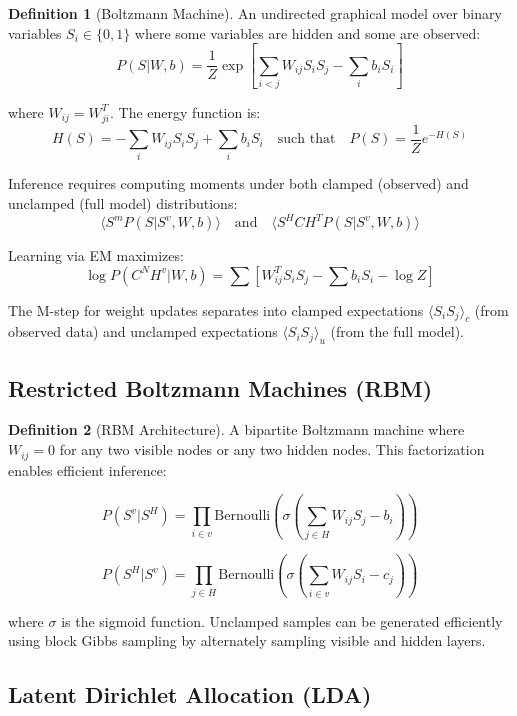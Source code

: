 \documentclass[12pt,a4paper]{article}
\theoremstyle{definition}
\newtheorem{definition}{Definition}[section]
\begin{document}
\begin{definition}[Boltzmann Machine]
An undirected graphical model over binary variables $S_i \in \{0, 1\}$ where some variables are hidden and some are observed:
\[
P(S | W, b) = \frac{1}{Z} \exp\left[\sum_{i < j} W_{ij} S_i S_j - \sum_i b_i S_i\right]
\]

where $W_{ij} = W_{ji}^T$. The energy function is:
\[
H(S) = -\sum_i W_{ij} S_i S_j + \sum_i b_i S_i \quad \text{such that} \quad P(S) = \frac{1}{Z} e^{-H(S)}
\]

Inference requires computing moments under both clamped (observed) and unclamped (full model) distributions:
\[
\langle S^m P(S | S^v, W, b) \rangle \quad \text{and} \quad \langle S^H C H^T P(S | S^v, W, b) \rangle
\]

Learning via EM maximizes:
\[
\log P(C^N H^v | W, b) = \sum \left[W_{ij}^T S_i S_j - \sum b_i S_i - \log Z\right]
\]

The M-step for weight updates separates into clamped expectations $\langle S_i S_j \rangle_c$ (from observed data) and unclamped expectations $\langle S_i S_j \rangle_u$ (from the full model).
\end{definition}

\subsection{Restricted Boltzmann Machines (RBM)}

\begin{definition}[RBM Architecture]
A bipartite Boltzmann machine where $W_{ij} = 0$ for any two visible nodes or any two hidden nodes. This factorization enables efficient inference:

\[
P(S^v | S^H) = \prod_{i \in v} \text{Bernoulli}\left(\sigma\left(\sum_{j \in H} W_{ij} S_j - b_i\right)\right)
\]

\[
P(S^H | S^v) = \prod_{j \in H} \text{Bernoulli}\left(\sigma\left(\sum_{i \in v} W_{ij} S_i - c_j\right)\right)
\]

where $\sigma$ is the sigmoid function. Unclamped samples can be generated efficiently using block Gibbs sampling by alternately sampling visible and hidden layers.
\end{definition}

\subsection{Latent Dirichlet Allocation (LDA)}
\end{document}
